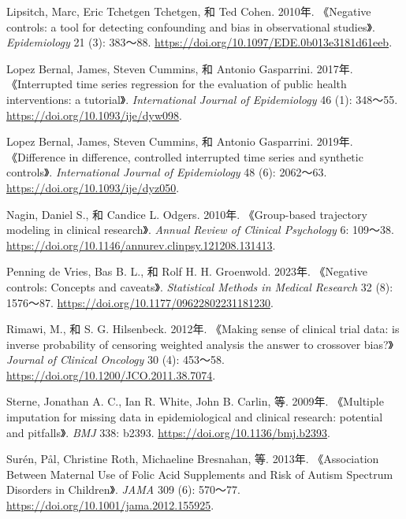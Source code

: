 \documentclass[
  chinese-hans,
  letterpaper,
  DIV=11,
  numbers=noendperiod]{scrreprt}
\newlength{\cslhangindent}
\newenvironment{CSLReferences}[2] %
 {\begin{list}{}{%
  \setlength{\itemindent}{0pt}
  \setlength{\leftmargin}{0pt}
  \setlength{\parsep}{0pt}
  \ifodd #1
   \setlength{\leftmargin}{\cslhangindent}
   \setlength{\itemindent}{-1\cslhangindent}
  \fi
  \setlength{\itemsep}{#2\baselineskip}}}
 {\end{list}}
\begin{document}
\begin{CSLReferences}{1}{1}
Lipsitch, Marc, Eric Tchetgen Tchetgen, 和 Ted Cohen. 2010年.
{《Negative controls: a tool for detecting confounding and bias in
observational studies》}. \emph{Epidemiology} 21 (3): 383～88.
\url{https://doi.org/10.1097/EDE.0b013e3181d61eeb}.

Lopez Bernal, James, Steven Cummins, 和 Antonio Gasparrini. 2017年.
{《Interrupted time series regression for the evaluation of public
health interventions: a tutorial》}. \emph{International Journal of
Epidemiology} 46 (1): 348～55. \url{https://doi.org/10.1093/ije/dyw098}.

Lopez Bernal, James, Steven Cummins, 和 Antonio Gasparrini. 2019年.
{《Difference in difference, controlled interrupted time series and
synthetic controls》}. \emph{International Journal of Epidemiology} 48
(6): 2062～63. \url{https://doi.org/10.1093/ije/dyz050}.

Nagin, Daniel S., 和 Candice L. Odgers. 2010年. {《Group-based
trajectory modeling in clinical research》}. \emph{Annual Review of
Clinical Psychology} 6: 109～38.
\url{https://doi.org/10.1146/annurev.clinpsy.121208.131413}.

Penning de Vries, Bas B. L., 和 Rolf H. H. Groenwold. 2023年.
{《Negative controls: Concepts and caveats》}. \emph{Statistical Methods
in Medical Research} 32 (8): 1576～87.
\url{https://doi.org/10.1177/09622802231181230}.

Rimawi, M., 和 S. G. Hilsenbeck. 2012年. {《Making sense of clinical
trial data: is inverse probability of censoring weighted analysis the
answer to crossover bias?》} \emph{Journal of Clinical Oncology} 30 (4):
453～58. \url{https://doi.org/10.1200/JCO.2011.38.7074}.

Sterne, Jonathan A. C., Ian R. White, John B. Carlin, 等. 2009年.
{《Multiple imputation for missing data in epidemiological and clinical
research: potential and pitfalls》}. \emph{BMJ} 338: b2393.
\url{https://doi.org/10.1136/bmj.b2393}.

Surén, Pål, Christine Roth, Michaeline Bresnahan, 等. 2013年.
{《Association Between Maternal Use of Folic Acid Supplements and Risk
of Autism Spectrum Disorders in Children》}. \emph{JAMA} 309 (6):
570～77. \url{https://doi.org/10.1001/jama.2012.155925}.


\end{CSLReferences}
\end{document}
